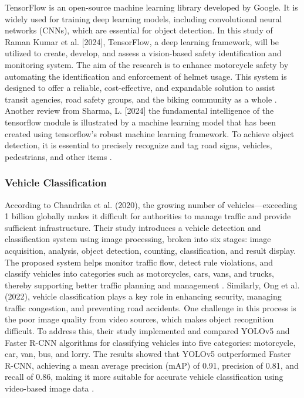 \begin{refsection}
 	TensorFlow is an open-source machine learning library developed by Google. It is widely used for training deep learning models, including convolutional neural networks (CNNs), which are essential for object detection. In this study of Raman Kumar et al. [2024], TensorFlow, a deep learning framework, will be utilized to create, develop, and assess a vision-based safety identification and monitoring system. The aim of the research is to enhance motorcycle safety by automating the identification and enforcement of helmet usage. This system is designed to offer a reliable, cost-effective, and expandable solution to assist transit agencies, road safety groups, and the biking community as a whole \cite{kumar2023vision}. Another review from Sharma, L. [2024] the fundamental intelligence of the tensorflow module is illustrated by a machine learning model that has been created using tensorflow's robust machine learning framework. To achieve object detection, it is essential to precisely recognize and tag road signs, vehicles, pedestrians, and other items \cite{sharma2024vision}.  

\subsubsection{Vehicle Classification}

According to Chandrika et al. (2020), the growing number of vehicles—exceeding 1 billion globally makes it difficult for authorities to manage traffic and provide sufficient infrastructure. Their study introduces a vehicle detection and classification system using image processing, broken into six stages: image acquisition, analysis, object detection, counting, classification, and result display. The proposed system helps monitor traffic flow, detect rule violations, and classify vehicles into categories such as motorcycles, cars, vans, and trucks, thereby supporting better traffic planning and management \cite{chandrika2019vehicle}.
Similarly, Ong et al.  (2022), vehicle classification plays a key role in enhancing security, managing traffic congestion, and preventing road accidents. One challenge in this process is the poor image quality from video sources, which makes object recognition difficult. To address this, their study implemented and compared YOLOv5 and Faster R-CNN algorithms for classifying vehicles into five categories: motorcycle, car, van, bus, and lorry. The results showed that YOLOv5 outperformed Faster R-CNN, achieving a mean average precision (mAP) of 0.91, precision of 0.81, and recall of 0.86, making it more suitable for accurate vehicle classification using video-based image data \cite{ong2022vehicle}.


\end{refsection}
